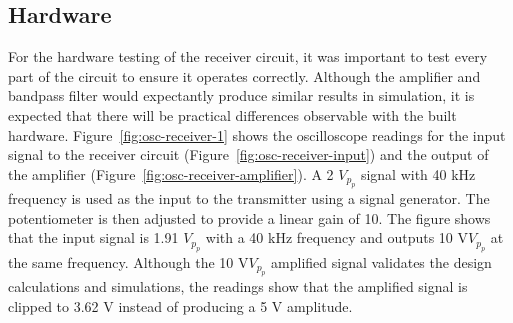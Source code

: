 \documentclass[class=report,11pt,crop=false]{standalone}
\begin{document}
\subsection{Hardware}
For the hardware testing of the receiver circuit, it was important to test every part of the circuit to ensure it operates correctly. Although the amplifier and bandpass filter would expectantly produce similar results in simulation, it is expected that there will be practical differences observable with the built hardware.
Figure~\ref{fig:osc-receiver-1} shows the oscilloscope readings for the input signal to the receiver circuit (Figure~\ref{fig:osc-receiver-input}) and the output of the amplifier (Figure~\ref{fig:osc-receiver-amplifier}). A 2 $V_p_p$ signal with 40 kHz frequency is used as the input to the transmitter using a signal generator. The potentiometer is then adjusted to provide a linear gain of 10. The figure shows that the input signal is 1.91 $V_p_p$ with a 40 kHz frequency and outputs 10 V$V_p_p$ at the same frequency. Although the 10 V$V_p_p$ amplified signal validates the design calculations and simulations, the readings show that the amplified signal is clipped to 3.62 V instead of producing a 5 V amplitude. 
\end{document}
